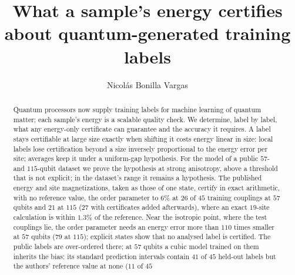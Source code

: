\documentclass[aps,prx,twocolumn,10pt,superscriptaddress,nofootinbib,longbibliography,floatfix]{revtex4-2}
\theoremstyle{remark}
\begin{document}
\title{What a sample's energy certifies about quantum-generated training labels}

\author{Nicol\'as Bonilla Vargas}

\begin{abstract}
Quantum processors now supply training labels for machine learning of quantum matter; each sample's energy is a
scalable quality check. We determine, label by label, what any energy-only certificate can guarantee
and the accuracy it requires. A label stays certifiable at large size exactly when
shifting it costs energy linear in size: local labels lose certification beyond a size inversely proportional
to the energy error per site; averages keep it under a uniform-gap hypothesis. For the model of a public
$57$- and $115$-qubit dataset we prove the hypothesis at strong anisotropy, above a threshold that is not explicit; %
in the dataset's range it remains a hypothesis. The published energy and site magnetizations, taken as those of
one state, certify in exact arithmetic, with no reference value, the order parameter to $6\%$ at $26$ of %
$45$ training couplings at $57$ qubits and $21$ at $115$ ($27$ with certificates added afterwards), where an exact %
$19$-site calculation is within $1.3\%$ of the reference. Near the %
isotropic point, where the test couplings lie, the order parameter needs an energy error more than $110$ times %
smaller at $57$ qubits ($79$ at $115$); explicit states show that no analysed label is certified. The public %
labels are over-ordered there; at $57$ qubits a cubic model trained on them inherits the bias: its standard %
prediction intervals contain $41$ of $45$ held-out labels but the authors' reference value at none ($11$ of $45$ %

\end{abstract}
\end{document}
